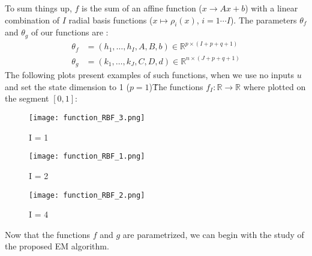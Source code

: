 To sum things up, $f$ is the sum of an affine function ($x \rightarrow Ax + b$) with a linear combination of $I$ radial basis functions ($x \mapsto \rho_i(x)$, $i=1 \cdots I$).
The parameters $\theta_f$ and $\theta_g$ of our functions are :
\begin{eqnarray*}
  \theta_f &= \left( h_1, \ldots , h_I, A, B, b\right)  \in \mathbb{R}^{p \times (I+p+q+1)}\\
  \theta_g &= \left( k_1, \ldots , k_J, C, D, d\right) \in \mathbb{R}^{n \times (J+p+q+1)}
\end{eqnarray*}
The following plots present examples of such functions, when we use no inputs $u$ and set the state dimension to 1 ($p = 1$)\. The functions $f_I : \mathbb{R} \to \mathbb{R}$ where plotted on the segment $\left [ 0 , 1 \right ]$:

\begin{figure}[H]
\captionsetup{labelformat=empty}
  \texttt{[image: function\_RBF\_3.png]}
  \caption{I = 1}
\endminipage\hfill
{}
  \texttt{[image: function\_RBF\_1.png]}
  \caption{I = 2}
\endminipage\hfill
{}
  \texttt{[image: function\_RBF\_2.png]}
  \caption{I = 4}
\endminipage\hfill
\end{figure}

Now that the functions $f$ and $g$ are parametrized, we can begin with the study of the proposed EM algorithm.
